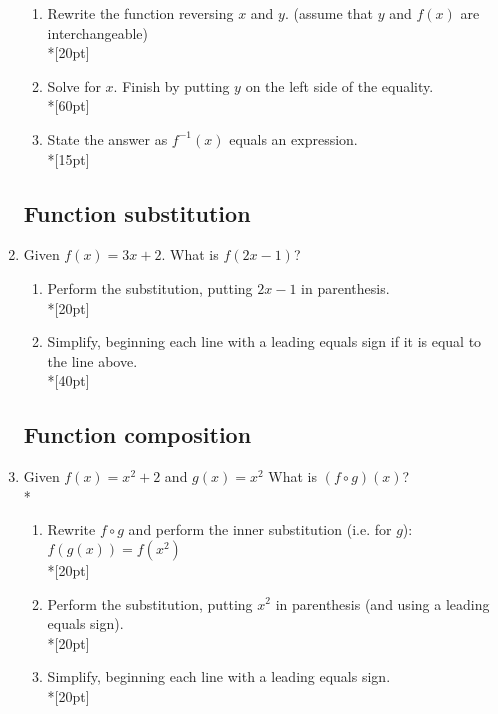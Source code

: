 \documentclass[12pt, oneside]{article}
\begin{document}
\begin{enumerate}
\begin{enumerate}
    \item Rewrite the function reversing $x$ and $y$. (assume that $y$ and $f(x)$ are interchangeable)\\*[20pt]
    \item Solve for $x$. Finish by putting $y$ on the left side of the equality.\\*[60pt]
    \item State the answer as $f^{-1} (x)$ equals an expression.\\*[15pt]
\end{enumerate}

\subsection*{Function substitution}
\item Given $f(x)=3x+2$. What is $f(2x-1)$?
\begin{enumerate}
    \item Perform the substitution, putting $2x-1$ in parenthesis.\\*[20pt]
    \item Simplify, beginning each line with a leading equals sign if it is equal to the line above.\\*[40pt]
\end{enumerate}

\subsection*{Function composition}
\item Given $f(x)=x^2+2$ and $g(x)=x^2$ What is $(f \circ g)(x)$?\\*
\begin{enumerate}
    \item Rewrite $f \circ g$ and perform the inner substitution (i.e. for $g$): $f(g(x))=f(x^2)$\\*[20pt]
    \item Perform the substitution, putting $x^2$ in parenthesis (and using a leading equals sign).\\*[20pt]
    \item Simplify, beginning each line with a leading equals sign.\\*[20pt]
\end{enumerate}

\end{enumerate}
\end{document}
